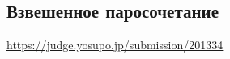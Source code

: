 \subsection{Взвешенное паросочетание}
\underline{\url{https://judge.yosupo.jp/submission/201334}}



